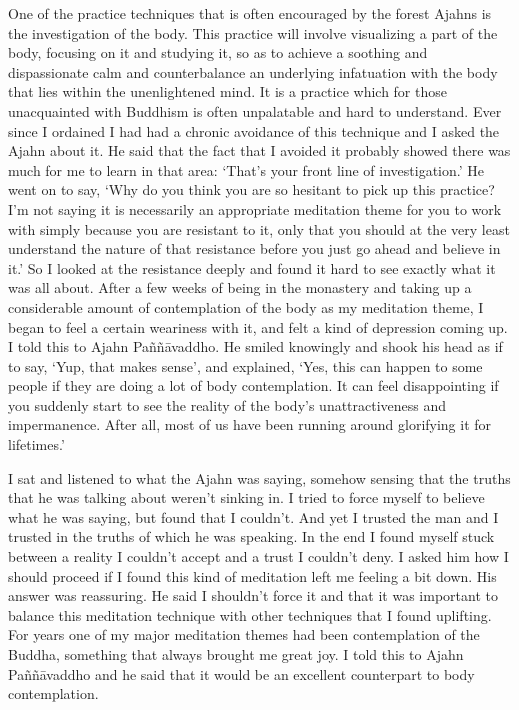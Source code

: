 One of the practice techniques that is often encouraged by the forest
Ajahns is the investigation of the body. This practice will involve
visualizing a part of the body, focusing on it and studying it, so as to
achieve a soothing and dispassionate calm and counterbalance an
underlying infatuation with the body that lies within the unenlightened
mind. It is a practice which for those unacquainted with Buddhism is
often unpalatable and hard to understand. Ever since I ordained I had
had a chronic avoidance of this technique and I asked the Ajahn about
it. He said that the fact that I avoided it probably showed there was
much for me to learn in that area: `That's your front line of
investigation.' He went on to say, `Why do you think you are so hesitant
to pick up this practice? I'm not saying it is necessarily an
appropriate meditation theme for you to work with simply because you are
resistant to it, only that you should at the very least understand the
nature of that resistance before you just go ahead and believe in it.'
So I looked at the resistance deeply and found it hard to see exactly
what it was all about. After a few weeks of being in the monastery and
taking up a considerable amount of contemplation of the body as my
meditation theme, I began to feel a certain weariness with it, and felt
a kind of depression coming up. I told this to Ajahn Paññāvaddho. He
smiled knowingly and shook his head as if to say, `Yup, that makes
sense', and explained, `Yes, this can happen to some people if they are
doing a lot of body contemplation. It can feel disappointing if you
suddenly start to see the reality of the body's unattractiveness and
impermanence. After all, most of us have been running around glorifying
it for lifetimes.'

I sat and listened to what the Ajahn was saying, somehow sensing that
the truths that he was talking about weren't sinking in. I tried to
force myself to believe what he was saying, but found that I couldn't. 
And yet I trusted the man and I trusted in the truths of which he was
speaking. In the end I found myself stuck between a reality I couldn't
accept and a trust I couldn't deny. I asked him how I should proceed if
I found this kind of meditation left me feeling a bit down. His answer
was reassuring. He said I shouldn't force it and that it was important
to balance this meditation technique with other techniques that I found
uplifting. For years one of my major meditation themes had been
contemplation of the Buddha, something that always brought me great joy. 
I told this to Ajahn Paññāvaddho and he said that it would be an
excellent counterpart to body contemplation. 

